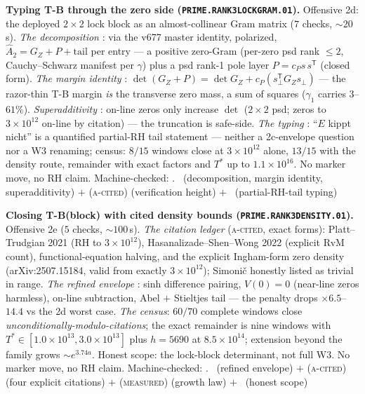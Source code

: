 \par\smallskip\noindent\textbf{Typing T-B through the zero side
(\texttt{PRIME.RANK3LOCKGRAM.01}).}
Offensive 2d: the deployed $2\times2$ lock block as an
almost-collinear Gram matrix ($7$ checks, ${\sim}20$\,s).  \emph{The
decomposition} \mE: via the v677 master identity, polarized,
$\hat A_2=G_Z+P+\mathrm{tail}$ per entry --- a positive zero-Gram
(per-zero psd rank $\le2$, Cauchy--Schwarz manifest per $\gamma$)
plus a psd rank-1 pole layer $P=c_Ps\,s^{\mathsf T}$ (closed form).
\emph{The margin identity} \mE:
$\det(G_Z+P)=\det G_Z+c_P(s_\perp^{\mathsf T}G_Zs_\perp)$ --- the
razor-thin T-B margin \emph{is} the transverse zero mass, a sum of
squares ($\gamma_1$ carries $3$--$61\%$).  \emph{Superadditivity}
\mE: on-line zeros only increase $\det$ ($2\times2$ psd; zeros to
$3\times10^{12}$ on-line by citation) --- the truncation is
safe-side.  \emph{The typing} \mC: ``$E$ kippt nicht'' is a
quantified partial-RH tail statement --- neither a 2c-envelope
question nor a W3 renaming; census: $8/15$ windows close at
$3\times10^{12}$ alone, $13/15$ with the density route, remainder
with exact factors and $T^*$ up to $1.1\times10^{16}$.  No marker
move, no RH claim.
Machine-checked: .
\mE\ (decomposition, margin identity, superadditivity) $+$
(\textsc{a-cited}) (verification height) $+$ \mC\ (partial-RH-tail
typing)
\par\smallskip


\par\smallskip\noindent\textbf{Closing T-B(block) with cited density
bounds (\texttt{PRIME.RANK3DENSITY.01}).}
Offensive 2e ($5$ checks, ${\sim}100$\,s).  \emph{The citation
ledger} (\textsc{a-cited}, exact forms): Platt--Trudgian 2021 (RH to
$3\times10^{12}$), Hasanalizade--Shen--Wong 2022 (explicit RvM
count), functional-equation halving, and the explicit Ingham-form
zero density (arXiv:2507.15184, valid from exactly
$3\times10^{12}$); Simoni\v{c} honestly listed as trivial in range.
\emph{The refined envelope} \mE: sinh difference pairing, $V(0)=0$
(near-line zeros harmless), on-line subtraction, Abel $+$ Stieltjes
tail --- the penalty drops $\times6.5$--$14.4$ vs the 2d worst case.
\emph{The census}: $60/70$ complete windows close
\emph{unconditionally-modulo-citations}; the exact remainder is nine
windows with $T^*\in[1.0\times10^{13},3.0\times10^{13}]$ plus
$h=5690$ at $8.5\times10^{14}$; extension beyond the family grows
${\sim}e^{3.74a}$.  Honest scope: the lock-block determinant, not
full W3.  No marker move, no RH claim.
Machine-checked: .
\mE\ (refined envelope) $+$ (\textsc{a-cited}) (four explicit
citations) $+$ (\textsc{measured}) (growth law) $+$ \mC\ (honest
scope)
\par\smallskip


